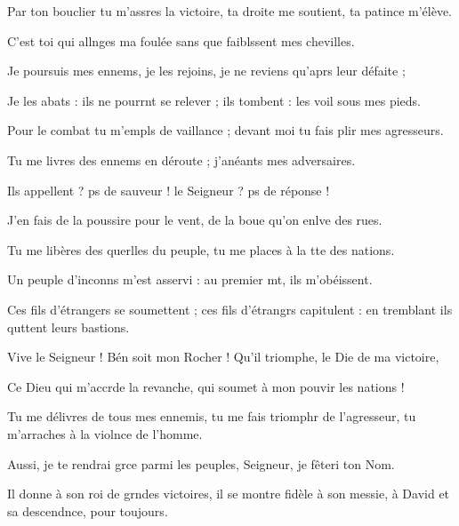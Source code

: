 \item Par ton bouclier tu m’assres la victoire,\psstar{} ta droite me soutient, ta patince m’élève.
\item C’est toi qui allnges ma foulée\psstar{} sans que faiblssent mes chevilles.
\item Je poursuis mes ennems, je les rejoins,\psstar{} je ne reviens qu’aprs leur défaite ;
\item Je les abats : ils ne pourrnt se relever ;\psstar{} ils tombent : les voil sous mes pieds.
\item Pour le combat tu m’empls de vaillance ;\psstar{} devant moi tu fais plir mes agresseurs.
\item Tu me livres des ennems en déroute ;\psstar{} j’anéants mes adversaires.
\item Ils appellent ? ps de sauveur !\psstar{} le Seigneur ? ps de réponse !
\item J’en fais de la poussire pour le vent,\psstar{} de la boue qu’on enlve des rues.
\item Tu me libères des querlles du peuple,\psstar{} tu me places à la tte des nations. 
\item Un peuple d’inconns m’est asservi :\psstar{} au premier mt, ils m’obéissent.
\item Ces fils d’étrangers se soumettent ;\pscross{} ces fils d’étrangrs capitulent :\psstar{} en tremblant ils quttent leurs bastions.
\item Vive le Seigneur ! Bén soit mon Rocher !\psstar{} Qu’il triomphe, le Die de ma victoire,
\item Ce Dieu qui m’accrde la revanche,\psstar{} qui soumet à mon pouvir les nations !
\item Tu me délivres de tous mes ennemis,\pscross{} tu me fais triomphr de l’agresseur,\psstar{} tu m’arraches à la violnce de l’homme.
\item Aussi, je te rendrai grce parmi les peuples,\psstar{} Seigneur, je fêteri ton Nom.
\item Il donne à son roi de grndes victoires,\psstar{} il se montre fidèle à son messie, à David et sa descendnce, pour toujours.